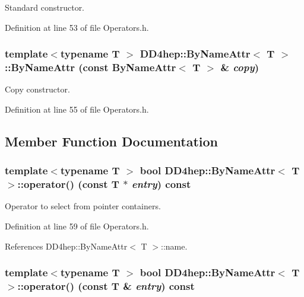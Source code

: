 Standard constructor. 

Definition at line 53 of file Operators.h.\hypertarget{class_d_d4hep_1_1_by_name_attr_a782ea1d32c95453edfa5da378770d03a}{
\subsubsection[{ByNameAttr}]{\setlength{\rightskip}{0pt plus 5cm}template$<$typename T $>$ {\bf DD4hep::ByNameAttr}$<$ {\bf T} $>$::{\bf ByNameAttr} (const {\bf ByNameAttr}$<$ {\bf T} $>$ \& {\em copy})}}
\label{class_d_d4hep_1_1_by_name_attr_a782ea1d32c95453edfa5da378770d03a}


Copy constructor. 

Definition at line 55 of file Operators.h.

\subsection{Member Function Documentation}
\hypertarget{class_d_d4hep_1_1_by_name_attr_a8243b550e4ecfef956a8ef9e75be78c8}{
\subsubsection[{operator()}]{\setlength{\rightskip}{0pt plus 5cm}template$<$typename T $>$ bool {\bf DD4hep::ByNameAttr}$<$ {\bf T} $>$::operator() (const {\bf T} $\ast$ {\em entry}) const}}
\label{class_d_d4hep_1_1_by_name_attr_a8243b550e4ecfef956a8ef9e75be78c8}


Operator to select from pointer containers. 

Definition at line 59 of file Operators.h.

References DD4hep::ByNameAttr$<$ T $>$::name.\hypertarget{class_d_d4hep_1_1_by_name_attr_a566d63995ef9b292ffb98eaaf54273fe}{
\subsubsection[{operator()}]{\setlength{\rightskip}{0pt plus 5cm}template$<$typename T $>$ bool {\bf DD4hep::ByNameAttr}$<$ {\bf T} $>$::operator() (const {\bf T} \& {\em entry}) const}}
\label{class_d_d4hep_1_1_by_name_attr_a566d63995ef9b292ffb98eaaf54273fe}


